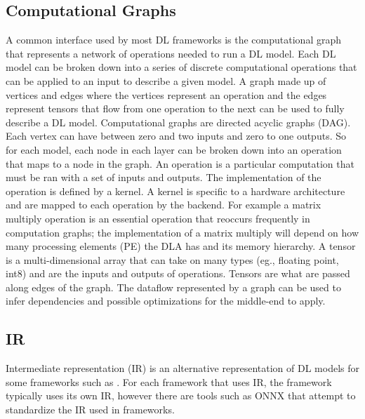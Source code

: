 \subsection{Computational Graphs}
A common interface used by most DL frameworks is the computational graph
\cite{tensorflow} \cite{cntk} that represents a network of operations needed to
run a DL model. Each DL model can be broken down into a series of discrete
computational operations that can be applied to an input to describe a given
model. A graph made up of vertices and edges where the vertices represent an
operation and the edges represent tensors that flow from one operation to the
next can be used to fully describe a DL model. Computational graphs are
directed acyclic graphs (DAG).  Each vertex can have between zero and two
inputs and zero to one outputs. So for each model, each node in each layer can
be broken down into an operation that maps to a node in the graph. An operation
is a particular computation that must be ran with a set of inputs and outputs.
The implementation of the operation is defined by a kernel. A kernel is
specific to a hardware architecture and are mapped to each operation by the
backend. For example a matrix multiply operation is an essential operation
that reoccurs frequently in computation graphs; the implementation of a matrix
multiply will depend on how many processing elements (PE) the DLA has and its
memory hierarchy. A tensor is a multi-dimensional array that can take on many
types (eg., floating point, int8) and are the inputs and outputs of operations.
Tensors are what are passed along edges of the graph. The dataflow represented
by a graph can be used to infer dependencies and possible optimizations for the
middle-end to apply.





\subsection{IR}
Intermediate representation (IR) is an alternative representation of DL models
for some frameworks such as \cite{DLVM} \cite{nGraph} \cite{ONNX}. For each
framework that uses IR, the framework typically uses its own IR, however
there are tools such as ONNX that attempt to standardize the IR used in
frameworks. 

